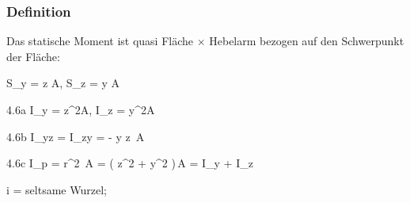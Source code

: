 \documentclass[11pt]{article}
\newcommand{\1}{ {\mathds{1}} }
\begin{document}
\begin{multicols*}{3}
		\subsubsection{Definition}

		Das statische Moment ist quasi Fläche $\times$ Hebelarm bezogen auf den Schwerpunkt der Fläche:

		\begin{formel}{4.5}
			S_y
			=
			\int z  A, \quad
			S_z
			=
			\int y  A
		\end{formel}

		\begin{formel}{4.6a}
			I_y
			=
			\int
			z^2A, \quad
			I_z
			=
			\int
			y^2A
		\end{formel}

		\begin{formel}{4.6b}
			I_{yz} = I_{zy} = -\!\int\! y z\, A
		\end{formel}

		\begin{formel}{4.6c}
			I_p = \int r^2 \,A = \int\! \left( z^2 + y^2  \right)\,A = I_y + I_z
		\end{formel}

		\begin{formel}{4.7}
			i = seltsame Wurzel; 
			\times
		\end{formel}


\end{multicols*}
\end{document}
